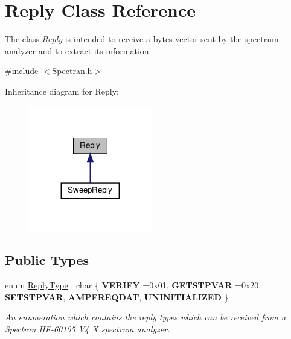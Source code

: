 \hypertarget{classReply}{}\section{Reply Class Reference}
\label{classReply}


The class {\itshape \hyperlink{classReply}{Reply}} is intended to receive a bytes vector sent by the spectrum analyzer and to extract its information.  




{\ttfamily \#include $<$Spectran.\+h$>$}



Inheritance diagram for Reply\+:\nopagebreak
\begin{figure}[H]
\begin{center}
\leavevmode
\includegraphics[width=152pt]{classReply__inherit__graph}
\end{center}
\end{figure}
\subsection*{Public Types}
\begin{DoxyCompactItemize}
\item 
enum \hyperlink{classReply_aa873dec4817ed08a5212ec3ba2b5c807}{Reply\+Type} \+: char \{ \newline
{\bfseries V\+E\+R\+I\+FY} =0x01, 
{\bfseries G\+E\+T\+S\+T\+P\+V\+AR} =0x20, 
{\bfseries S\+E\+T\+S\+T\+P\+V\+AR}, 
{\bfseries A\+M\+P\+F\+R\+E\+Q\+D\+AT}, 
\newline
{\bfseries U\+N\+I\+N\+I\+T\+I\+A\+L\+I\+Z\+ED}
 \}\begin{DoxyCompactList}\small\item\em An enumeration which contains the reply types which can be received from a Spectran H\+F-\/60105 V4 X spectrum analyzer. \end{DoxyCompactList}
\end{DoxyCompactItemize}
